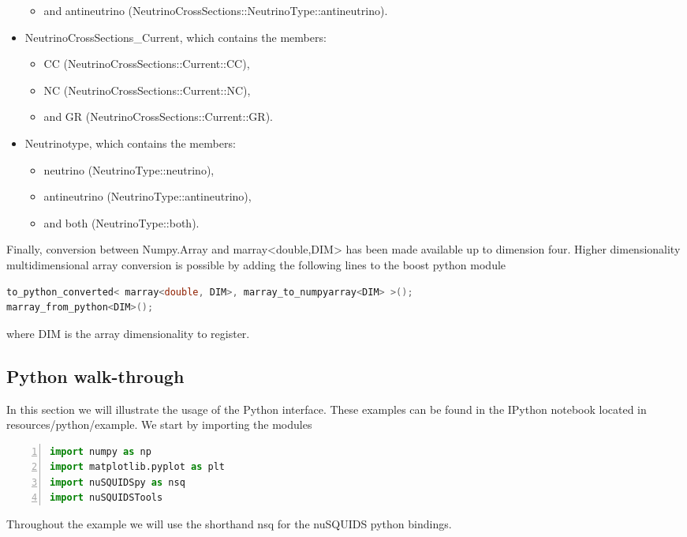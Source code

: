 \documentclass[3p,12pt]{elsarticle}
\newcommand{\ttf}{\ttfamily}
\begin{document}
\begin{itemize}
\begin{itemize}
      \item and {\ttf antineutrino} ({\ttf NeutrinoCrossSections::NeutrinoType::antineutrino}).
    \end{itemize}
  \item {\ttf NeutrinoCrossSections\_Current}, which contains the members:
    \begin{itemize}
      \item {\ttf CC} ({\ttf NeutrinoCrossSections::Current::CC}),
      \item {\ttf NC} ({\ttf NeutrinoCrossSections::Current::NC}),
      \item and {\ttf GR} ({\ttf NeutrinoCrossSections::Current::GR}).
    \end{itemize}
  \item {\ttf Neutrinotype}, which contains the members:
    \begin{itemize}
      \item {\ttf neutrino} ({\ttf NeutrinoType::neutrino}),
      \item {\ttf antineutrino} ({\ttf NeutrinoType::antineutrino}),
      \item and {\ttf both} ({\ttf NeutrinoType::both}).
    \end{itemize}
\end{itemize}

Finally, conversion between {\ttf Numpy.Array} and {\ttf marray<double,DIM>} has been made available up to dimension four.
Higher dimensionality multidimensional array conversion is possible by adding the following lines to the boost python module
\begin{lstlisting}[language=C++]
to_python_converted< marray<double, DIM>, marray_to_numpyarray<DIM> >();
marray_from_python<DIM>();
\end{lstlisting}
where {\ttf DIM} is the array dimensionality to register.

\subsection{Python walk-through}

In this section we will illustrate the usage of the {\ttf Python} interface. 
These examples can be found in the IPython notebook located in {\ttf resources/python/example}.
We start by importing the modules
\begin{lstlisting}[language=Python, frame=leftline, numbers=left, breaklines=true]
import numpy as np
import matplotlib.pyplot as plt
import nuSQUIDSpy as nsq
import nuSQUIDSTools
\end{lstlisting}
Throughout the example we will use the shorthand {\ttf nsq} for the {\ttf nuSQUIDS} python bindings.
\end{document}
